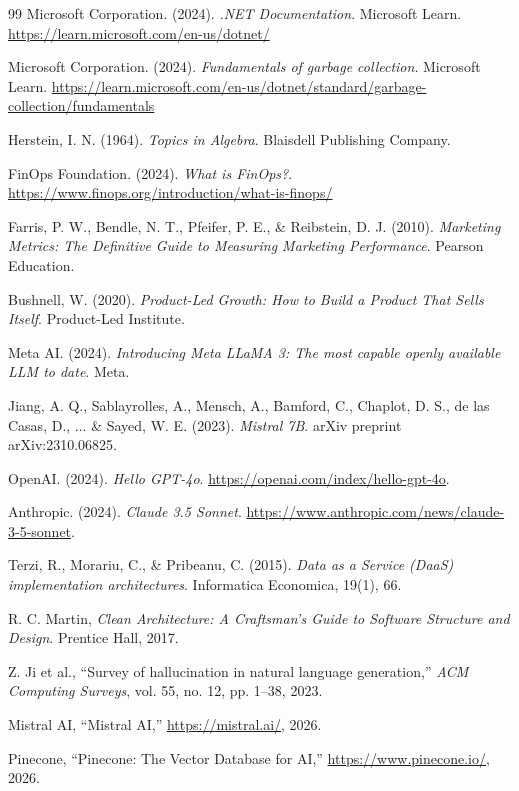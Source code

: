 \begin{thebibliography}{99}
Microsoft Corporation. (2024). \textit{.NET Documentation}. Microsoft Learn. \url{https://learn.microsoft.com/en-us/dotnet/}

Microsoft Corporation. (2024). \textit{Fundamentals of garbage collection}. Microsoft Learn. \url{https://learn.microsoft.com/en-us/dotnet/standard/garbage-collection/fundamentals}

Herstein, I. N. (1964). \textit{Topics in Algebra}. Blaisdell Publishing Company.

FinOps Foundation. (2024). \textit{What is FinOps?}. \url{https://www.finops.org/introduction/what-is-finops/}

Farris, P. W., Bendle, N. T., Pfeifer, P. E., \& Reibstein, D. J. (2010). \textit{Marketing Metrics: The Definitive Guide to Measuring Marketing Performance}. Pearson Education.

Bushnell, W. (2020). \textit{Product-Led Growth: How to Build a Product That Sells Itself}. Product-Led Institute.

Meta AI. (2024). \textit{Introducing Meta LLaMA 3: The most capable openly available LLM to date}. Meta.

Jiang, A. Q., Sablayrolles, A., Mensch, A., Bamford, C., Chaplot, D. S., de las Casas, D., ... \& Sayed, W. E. (2023). \textit{Mistral 7B}. arXiv preprint arXiv:2310.06825.

OpenAI. (2024). \textit{Hello GPT-4o}. \url{https://openai.com/index/hello-gpt-4o}.

Anthropic. (2024). \textit{Claude 3.5 Sonnet}. \url{https://www.anthropic.com/news/claude-3-5-sonnet}.

Terzi, R., Morariu, C., \& Pribeanu, C. (2015). \textit{Data as a Service (DaaS) implementation architectures}. Informatica Economica, 19(1), 66.

R. C. Martin, \emph{Clean Architecture: A Craftsman's Guide to Software Structure and Design}. Prentice Hall, 2017.

Z. Ji et al., ``Survey of hallucination in natural language generation,'' \emph{ACM Computing Surveys}, vol. 55, no. 12, pp. 1--38, 2023.

Mistral AI, ``Mistral AI,'' \url{https://mistral.ai/}, 2026.

Pinecone, ``Pinecone: The Vector Database for AI,'' \url{https://www.pinecone.io/}, 2026.


\end{thebibliography}
